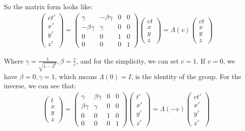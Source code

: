 \documentclass[]{ctexart}
\begin{document}
			So the matrix form looks like:
				\begin{equation*}
				\begin{aligned}
					\begin{pmatrix}
						ct'\\
						x'\\
						y'\\
						z'
					\end{pmatrix}
					=
					\begin{pmatrix}
						\gamma & -\beta \gamma & 0 & 0\\
						-\beta \gamma & \gamma & 0 & 0\\
						0 & 0 & 1 & 0\\
						0 & 0 & 0 & 1
					\end{pmatrix}
					\begin{pmatrix}
						ct\\
						x\\
						y\\
						z
					\end{pmatrix}
					=
					\Lambda(v)
					\begin{pmatrix}
					ct\\
					x\\
					y\\
					z
					\end{pmatrix}
				\end{aligned}
				\end{equation*}
		
			Where $\gamma =\frac{1}{\sqrt{1-\beta^2}}, \beta=\frac{v}{c}$, and for the simplicity, we can set $c=1$. If $v=0$, we have $\beta=0, \gamma=1$, which means $\Lambda(0)=I$, is the identity of the group. For the inverse, we can see that:	
				\begin{equation*}
				\begin{aligned}
					\begin{pmatrix}
						t\\
						x\\
						y\\
						z
					\end{pmatrix}
					=
					\begin{pmatrix}
						\gamma & \beta \gamma & 0 & 0\\
						\beta \gamma & \gamma & 0 & 0\\
						0 & 0 & 1 & 0\\
						0 & 0 & 0 & 1
					\end{pmatrix}
					\begin{pmatrix}
						t'\\
						x'\\
						y'\\
						z'
					\end{pmatrix}
					=
					\Lambda(-v)
					\begin{pmatrix}
						ct'\\
						x'\\
						y'\\
						z'
					\end{pmatrix}
				\end{aligned}
				\end{equation*}
			
\end{document}
